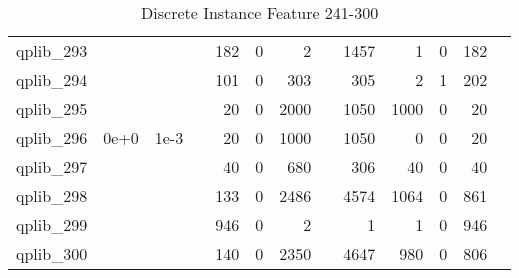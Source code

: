 \begin{table}
\begin{tabular}{lrrrrrrrrrrrr}
qplib\_293	&		&		&	&	182	&	0	&	2	&	&	1457	&	1	&	0	&	182	\\
qplib\_294	&		&		&	&	101	&	0	&	303	&	&	305	&	2	&	1	&	202	\\
qplib\_295	&		&		&	&	20	&	0	&	2000	&	&	1050	&	1000	&	0	&	20	\\
qplib\_296	&	0e+0	&	1e-3	&	&	20	&	0	&	1000	&	&	1050	&	0	&	0	&	20	\\
qplib\_297	&		&		&	&	40	&	0	&	680	&	&	306	&	40	&	0	&	40	\\
qplib\_298	&		&		&	&	133	&	0	&	2486	&	&	4574	&	1064	&	0	&	861	\\
qplib\_299	&		&		&	&	946	&	0	&	2	&	&	1	&	1	&	0	&	946	\\
qplib\_300	&		&		&	&	140	&	0	&	2350	&	&	4647	&	980	&	0	&	806	\\
											


\bottomrule

\end{tabular}  
\label{tab:A5}
\caption{Discrete  Instance Feature 241-300} 

\end{table}

